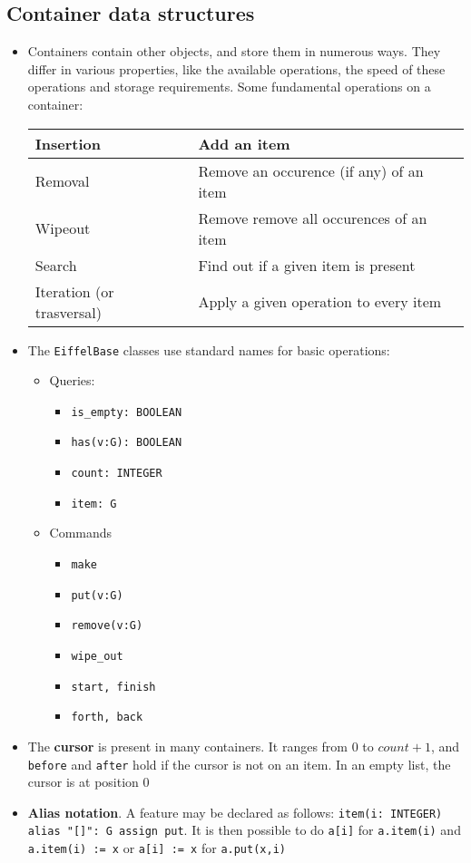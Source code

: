 \documentclass[a4paper]{article}
\newcommand{\inline}[1]{\lstinline!#1!}%
\begin{document}
\subsection{Container data structures}
\begin{itemize}
\item Containers contain other objects, and store them in numerous ways. They differ in various properties, like the available operations, the speed of these operations and storage requirements. Some fundamental operations on a container:\\
\begin{center}
\begin{tabular}{|l|l|}
\hline
Insertion & Add an item\\\hline
Removal & Remove an occurence (if any) of an item\\\hline
Wipeout & Remove remove all occurences of an item\\\hline
Search & Find out if a given item is present \\\hline
Iteration (or trasversal) & Apply a given operation to every item\\\hline
\end{tabular}
\end{center}
\item The \inline{EiffelBase} classes use standard names for basic operations:
\begin{itemize}
\item Queries:
\begin{itemize}
\item \inline{is_empty: BOOLEAN}
\item\inline{has(v:G): BOOLEAN}
\item \inline{count: INTEGER}
\item \inline{item: G}
\end{itemize}
\item Commands
\begin{itemize}
\item \inline{make}
\item \inline{put(v:G)}
\item\inline{remove(v:G)}
\item\inline{wipe_out}
\item\inline{start, finish}
\item\inline{forth, back}
\end{itemize}
\end{itemize}
\item The \textbf{cursor} is present in many containers. It ranges from $0$ to $count+1$, and \inline{before} and \inline{after} hold if the cursor is not on an item. In an empty list, the cursor is at position $0$
\item \textbf{Alias notation}. A feature may be declared as follows: \inline{item(i: INTEGER) alias "[]": G assign put}. It is then possible to do \inline{a[i]} for \inline{a.item(i)} and \inline{a.item(i) := x} or \inline{a[i] := x} for \inline{a.put(x,i)}
\end{itemize}
\end{document}
